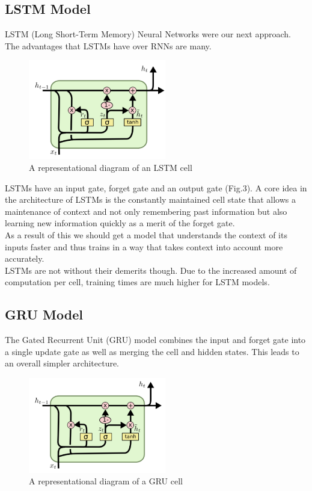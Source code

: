 \documentclass[12pt, conference]{IEEEtran}
\begin{document}
\subsection{LSTM Model}

LSTM (Long Short-Term Memory) Neural Networks were our next approach. The advantages that LSTMs have over RNNs are many. \\
\begin{figure}[h]
\centering
\includegraphics[width=6cm]{images/lstm.png}
\caption{A representational diagram of an LSTM cell}
\end{figure}
LSTMs have an input gate, forget gate and an output gate (Fig.3). A core idea in the architecture of LSTMs is the constantly maintained cell state that allows a maintenance of context and not only remembering past information but also learning new information quickly as a merit of the forget gate. \\ 
As a result of this we should get a model that understands the context of its inputs faster and thus trains in a way that takes context into account more accurately.\\
LSTMs are not without their demerits though. Due to the increased amount of computation per cell, training times are much higher for LSTM models.

\subsection{GRU Model}
The Gated Recurrent Unit (GRU) model combines the input and forget gate into a single update gate as well as merging the cell and hidden states. This leads to an overall simpler architecture.
\begin{figure}[h]
\centering
\includegraphics[width=6cm]{images/gru.png}
\caption{A representational diagram of a GRU cell}
\end{figure}
\end{document}
